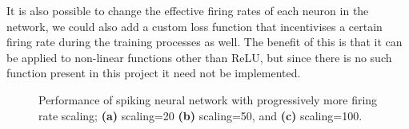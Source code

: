 It is also possible to change the effective firing rates of each neuron in the network, we could also add a custom loss function that incentivises a certain firing rate during the training processes as well. The benefit of this is that it can be applied to non-linear functions other than ReLU, but since there is no such function present in this project it need not be implemented.

\begin{figure}[htb]%
    \centering
    \qquad
    \qquad
    \caption{Performance of spiking neural network with progressively more firing rate scaling; \textbf{(a)} scaling=20 \textbf{(b)} scaling=50, and \textbf{(c)} scaling=100.}%
    \label{fig:post_firing_rate_scaling}%
\end{figure}